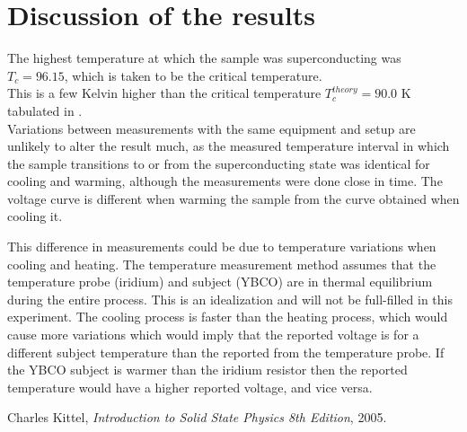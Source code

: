 \documentclass[a4paper,twoside=false,abstract=false,numbers=noenddot,
titlepage=false,headings=small,parskip=half,version=last]{scrartcl}
\begin{document}
\section{Discussion of the results}
The highest temperature at which the sample was superconducting was $T_c = 96.15$, which is taken to be the critical temperature.\\
This is a few Kelvin higher than the critical temperature $T_c^{theory}=90.0$ K
tabulated in \cite{Kittel}.\\
Variations between measurements with the same equipment and setup are unlikely to alter the result much, as the measured temperature interval in which the sample transitions to or from the superconducting state was identical for cooling and warming, although the measurements were done close in time.
The voltage curve is different when warming the sample from the curve obtained when cooling it.

This difference in measurements could be due to temperature variations when cooling and heating.
The temperature measurement method assumes that the temperature probe (iridium)
and subject (YBCO) are in thermal equilibrium during the entire process. This
is an idealization and will not be full-filled in this experiment.
The cooling process is faster than the heating process, which would cause more
variations which would imply that the reported voltage is for a different
subject temperature than the reported from the temperature probe.
If the YBCO subject is warmer than the iridium resistor then the reported
temperature would have a higher reported voltage, and vice versa.

\begin{thebibliography}{1}
        Charles Kittel,
        {\em Introduction to Solid State Physics 8th Edition},
        2005.
\end{thebibliography}
\end{document}
